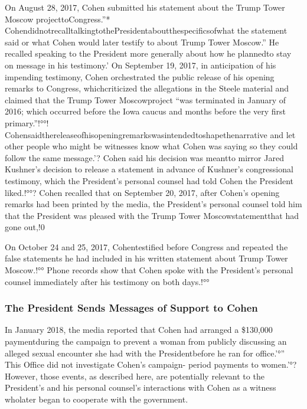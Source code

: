On August 28, 2017, Cohen submitted his statement about the Trump Tower Moscow projecttoCongress.”* CohendidnotrecalltalkingtothePresidentaboutthespecificsofwhat the statement said or what Cohen would later testify to about Trump Tower Moscow.” He recalled speaking to the President more generally about how he plannedto stay on message in his testimony.' On September 19, 2017, in anticipation of his impending testimony, Cohen orchestrated the public release of his opening remarks to Congress, whichcriticized the allegations in the Steele material and claimed that the Trump Tower Moscowproject “was terminated in January of 2016; which occurred before the Iowa caucus and months before the very first primary.”!°°! Cohensaidthereleaseofhisopeningremarkswasintendedtoshapethenarrative and let other people who might be witnesses know what Cohen was saying so they could follow the same message.'? Cohen said his decision was meantto mirror Jared Kushner’s decision to release a statement in advance of Kushner’s congressional testimony, which the President’s personal counsel had told Cohen the President liked.!°°? Cohen recalled that on September 20, 2017, after Cohen’s opening remarks had been printed by the media, the President’s personal counsel told him that the President was pleased with the Trump Tower Moscowstatementthat had gone out,!0%

On October 24 and 25, 2017, Cohentestified before Congress and repeated the false statements he had included in his written statement about Trump Tower Moscow.!°° Phone records show that Cohen spoke with the President’s personal counsel immediately after his testimony on both days.!°°%

\subsubsection{The President Sends Messages of Support to Cohen}

In January 2018, the media reported that Cohen had arranged a \$130,000 paymentduring the campaign to prevent a woman from publicly discussing an alleged sexual encounter she had with the Presidentbefore he ran for office.'°” This Office did not investigate Cohen’s campaign- period payments to women.'°? However, those events, as described here, are potentially relevant to the President’s and his personal counsel’s interactions with Cohen as a witness wholater began to cooperate with the government.

